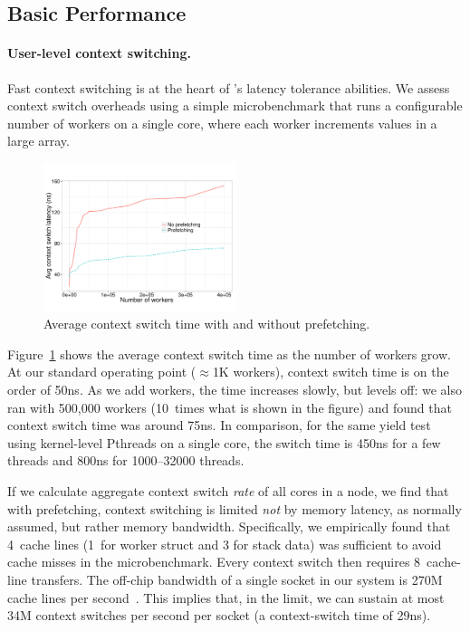 \subsection{Basic \Grappa Performance}
\label{eval:basic}

\paragraph{User-level context switching.}

Fast context switching is at the heart of \Grappa's
latency tolerance abilities. We assess context switch overheads using a simple
microbenchmark that runs a configurable number of workers on a single core, where each worker 
increments values in a large array. 

\begin{figure}[ht]
    \begin{center}
      \includegraphics[width=0.5\textwidth]{figs/context_switch_time.pdf}
    \end{center}
    \caption{Average context switch time with and without prefetching.}
    \label{fig:context-switch-exp}
\end{figure}

Figure~\ref{fig:context-switch-exp} shows the average context switch
time as the number of workers grow. At our standard operating point
($\approx$1K workers), context switch time is on the order of
50ns. As we add workers, the time increases slowly, but levels off:
we also ran with 500,000 workers (10~times what is shown in the
figure) and found that context switch time was around 75ns. In
comparison, for the same yield test using kernel-level Pthreads on a
single core, the switch time is 450ns for a few threads and 800ns for
1000--32000 threads.

If we calculate aggregate context switch \emph{rate\/} of all
cores in a node, we find that with prefetching, \Grappa context
switching is
limited \emph{not\/} by memory latency, as normally assumed, but rather memory bandwidth.
Specifically, we empirically found that 4~cache lines (1~for worker
struct and 3 for stack data) was sufficient to avoid cache misses in
the microbenchmark. Every context switch then requires 8~cache-line transfers. The off-chip
bandwidth of a single socket in our system is 270M cache lines per
second~\cite{porterfield:bw,Nelson:hotpar11}. This implies that, in the limit,
we can sustain at most 34M context switches per second per socket (a context-switch time of 29ns).

